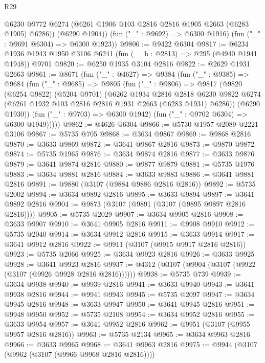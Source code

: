 \begin{lexlean}{R29}
\begin{coremodule}
          @6230
          @9772
          @6274
          (@6261 @1906 @103 @2816 @2816 @1905 @2663 (@6283 @1905) @6286))
        (@6290 @1904))
      (fun ("_" : @9692) => @6300 @1916)
      (fun ("_" : @9691 @6304) => @6300 @1923))
@9806 := @9422 @6304
@9817 := @6234 @1936 @1943 @1950 @3106 @6241 (fun (__b : @2813) => @295 (@4940 @1941 @1948)) @9701
@9820 := @6250 @1935 @3104 @2816
@9822 := @2629 @1931 @2663
@9861 := @8671
    (fun ("_" : @4627) =>
    @9384
      (fun ("_" : @9385) =>
      @9684
        (fun ("_" : @9685) =>
        @9805
          (fun ("_" : @9806) =>
          @9817
            (@9820
              (@6254 @9822)
              (@5204 @9701)
              (@6262
                @1934
                @2816
                @2818
                @6230
                @9822
                @6274
                (@6261 @1932 @103 @2816 @2816 @1931 @2663 (@6283 @1931) @6286))
              (@6290 @1930))
            (fun ("_" : @9703) => @6300 @1942)
            (fun ("_" : @9702 @6304) => @6300 @1949)))))
@9862 := @4626 @6304
@9866 := @5730 @1957 @2089 @2221 @3106
@9867 := @5735 @705
@9868 := @3634 @9867
@9869 := @9868 @2816
@9870 := @3633 @9869
@9872 := @3641 @9867 @2816
@9873 := @9870 @9872
@9874 := @5735 @1965
@9876 := @3634 @9874 @2816
@9877 := @3633 @9876
@9879 := @3641 @9874 @2816
@9880 := @9877 @9879
@9881 := @5735 @1976
@9883 := @3634 @9881 @2816
@9884 := @3633 @9883
@9886 := @3641 @9881 @2816
@9891 := @9880 (@3107 (@9884 @9886 @2816 @2816))
@9892 := @5735 @2002
@9894 := @3634 @9892 @2816
@9895 := @3633 @9894
@9897 := @3641 @9892 @2816
@9904 := @9873 (@3107 (@9891 (@3107 (@9895 @9897 @2816 @2816))))
@9905 := @5735 @2029
@9907 := @3634 @9905 @2816
@9908 := @3633 @9907
@9910 := @3641 @9905 @2816
@9911 := @9908 @9910
@9912 := @5735 @2040
@9914 := @3634 @9912 @2816
@9915 := @3633 @9914
@9917 := @3641 @9912 @2816
@9922 := @9911 (@3107 (@9915 @9917 @2816 @2816))
@9923 := @5735 @2066
@9925 := @3634 @9923 @2816
@9926 := @3633 @9925
@9928 := @3641 @9923 @2816
@9937 := @4312 (@3107 (@9904 (@3107 (@9922 (@3107 (@9926 @9928 @2816 @2816))))))
@9938 := @5735 @739
@9939 := @3634 @9938
@9940 := @9939 @2816
@9941 := @3633 @9940
@9943 := @3641 @9938 @2816
@9944 := @9941 @9943
@9945 := @5735 @2097
@9947 := @3634 @9945 @2816
@9948 := @3633 @9947
@9950 := @3641 @9945 @2816
@9951 := @9948 @9950
@9952 := @5735 @2108
@9954 := @3634 @9952 @2816
@9955 := @3633 @9954
@9957 := @3641 @9952 @2816
@9962 := @9951 (@3107 (@9955 @9957 @2816 @2816))
@9963 := @5735 @2134
@9965 := @3634 @9963 @2816
@9966 := @3633 @9965
@9968 := @3641 @9963 @2816
@9975 := @9944 (@3107 (@9962 (@3107 (@9966 @9968 @2816 @2816))))

\end{coremodule}
\end{lexlean}
